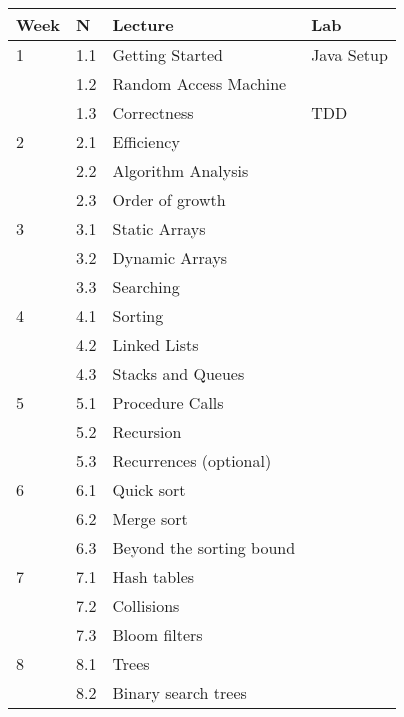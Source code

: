 \begin{table}[p]
  \begin{center}
  \begin{tabular}{llll}
    \toprule
    Week & N    & Lecture                   & Lab        \\
    \midrule 
    1    & 1.1  & Getting Started           & Java Setup \\
         & 1.2  & Random Access Machine     &            \\
         & 1.3  & Correctness               & TDD        \\
    2    & 2.1  & Efficiency                &            \\
         & 2.2  & Algorithm Analysis        &            \\
         & 2.3  & Order of growth           &            \\
    \midrule
    3    & 3.1  & Static Arrays             &            \\
         & 3.2  & Dynamic Arrays            &            \\
         & 3.3  & Searching                 &            \\
    4    & 4.1  & Sorting                   &            \\
         & 4.2  & Linked Lists              &            \\
         & 4.3  & Stacks and Queues         &            \\
    5    & 5.1  & Procedure Calls           &            \\
         & 5.2  & Recursion                 &            \\
         & 5.3  & Recurrences (optional)    &            \\
    6    & 6.1  & Quick sort                &            \\
         & 6.2  & Merge sort                &            \\
         & 6.3  & Beyond the sorting bound  &            \\
    \midrule
    7    & 7.1  & Hash tables               &            \\
         & 7.2  & Collisions                &            \\
         & 7.3  & Bloom filters             &            \\
    \midrule
    8    & 8.1  & Trees                     &            \\
         & 8.2  & Binary search trees       &            \\

\end{tabular}
\end{center}
\end{table}
